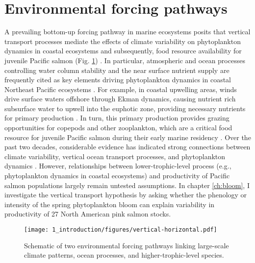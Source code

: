 

\section{Environmental forcing pathways}

A prevailing bottom-up forcing pathway in marine ecosystems posits that vertical
transport processes mediate the effects of climate variability on phytoplankton
dynamics in coastal ecosystems and subsequently, food resource availability for
juvenile Pacific salmon (Fig. \ref{fig:intro:1}) \citep{DiLorenzo2013b,
Rykaczewski2008a, Ware1991a}. In particular, atmospheric and ocean processes
controlling water column stability and the near surface nutrient supply are
frequently cited as key elements driving phytoplankton dynamics in coastal
Northeast Pacific ecosystems \citep{Henson2007a, Gargett1997a}. For example, in
coastal upwelling areas, winds drive surface waters offshore through Ekman
dynamics, causing nutrient rich subsurface water to upwell into the euphotic
zone, providing necessary nutrients for primary production \citep{Huyer1983}. In
turn, this primary production provides grazing opportunities for copepods and
other zooplankton, which are a critical food resource for juvenile Pacific
salmon during their early marine residency \citep{Armstrong2008a,
Beauchamp2007a, Brodeur2007a}. Over the past two decades, considerable evidence
has indicated strong connections between climate variability, vertical ocean
transport processes, and phytoplankton dynamics \citep{Chenillat2012,
Polovina1995a, Henson2007a, Henson2007b, Stabeno2004a, Weingartner2002a}.
However, relationships between lower-trophic-level process (e.g., phytoplankton
dynamics in coastal ecosystems) and productivity of Pacific salmon populations
largely remain untested assumptions. In chapter \ref{ch:bloom}, I investigate
the vertical transport hypothesis by asking whether the phenology or intensity
of the spring phytoplankton bloom can explain variability in productivity of 27
North American pink salmon stocks.

\begin{figure}[htbp]
  \centering
  \texttt{[image: 1\_introduction/figures/vertical-horizontal.pdf]}
  \caption[Schematic of two environmental forcing pathways.]{Schematic of two
           environmental forcing pathways linking large-scale climate patterns,
           ocean processes, and higher-trophic-level species.}
  \label{fig:intro:1}
\end{figure}

